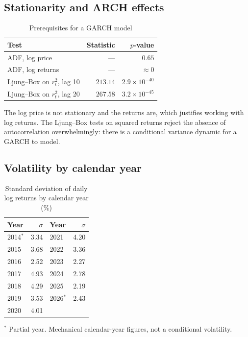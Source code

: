 \documentclass[12pt,a4paper]{article}
\begin{document}
\subsection{Stationarity and ARCH effects}

\begin{table}[H]
	\centering
	\caption{Prerequisites for a GARCH model}
	\label{tab:data-tests}
	\begin{tabular}{lrr}
		\toprule
		Test & Statistic & $p$-value \\
		\midrule
		ADF, log price & --- & $0.65$ \\
		ADF, log returns & --- & $\approx 0$ \\
		Ljung--Box on $r_t^2$, lag 10 & $213.14$ & $2.9\times10^{-40}$ \\
		Ljung--Box on $r_t^2$, lag 20 & $267.58$ & $3.2\times10^{-45}$ \\
		\bottomrule
	\end{tabular}
\end{table}

The log price is not stationary and the returns are, which justifies working with log returns. The Ljung--Box tests on squared returns reject the absence of autocorrelation overwhelmingly: there is a conditional variance dynamic for a GARCH to model.

\subsection{Volatility by calendar year}

\begin{table}[H]
	\centering
	\caption{Standard deviation of daily log returns by calendar year (\%)}
	\label{tab:data-yearly}
	\begin{tabular}{lrlr}
		\toprule
		Year & $\sigma$ & Year & $\sigma$ \\
		\midrule
		2014$^{*}$ & 3.34 & 2021 & 4.20 \\
		2015 & 3.68 & 2022 & 3.36 \\
		2016 & 2.52 & 2023 & 2.27 \\
		2017 & 4.93 & 2024 & 2.78 \\
		2018 & 4.29 & 2025 & 2.19 \\
		2019 & 3.53 & 2026$^{*}$ & 2.43 \\
		2020 & 4.01 & & \\
		\bottomrule
	\end{tabular}

	\smallskip
	{\footnotesize $^{*}$ Partial year. Mechanical calendar-year figures, not a conditional volatility.}
\end{table}
\end{document}
